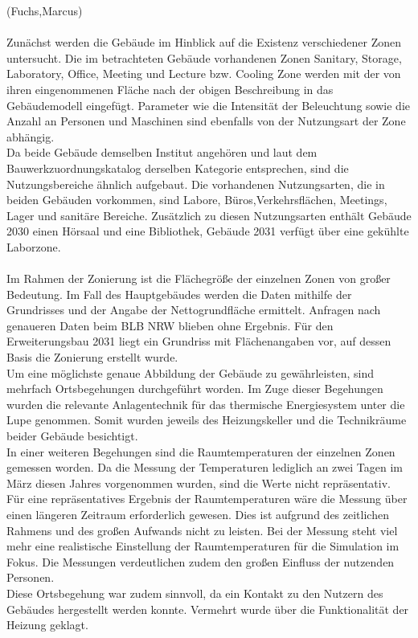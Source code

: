 (Fuchs,Marcus)\\
\\
Zunächst werden die Gebäude im Hinblick auf die Existenz verschiedener Zonen untersucht. Die im betrachteten Gebäude vorhandenen Zonen Sanitary, Storage, Laboratory, Office, Meeting und Lecture bzw. Cooling Zone werden mit der von ihren eingenommenen Fläche nach der obigen Beschreibung in das Gebäudemodell eingefügt. Parameter wie die Intensität der Beleuchtung sowie die Anzahl an Personen und Maschinen sind ebenfalls von der Nutzungsart der Zone abhängig. \\
Da beide Gebäude demselben Institut angehören und laut dem Bauwerkzuordnungskatalog derselben Kategorie entsprechen, sind die Nutzungsbereiche ähnlich aufgebaut. Die vorhandenen Nutzungsarten, die in beiden Gebäuden vorkommen, sind Labore, Büros,Verkehrsflächen, Meetings, Lager und sanitäre Bereiche. Zusätzlich zu diesen Nutzungsarten enthält Gebäude 2030 einen Hörsaal und eine Bibliothek, Gebäude 2031 verfügt über eine gekühlte Laborzone.\\
\\
Im Rahmen der Zonierung ist die Flächegröße der einzelnen Zonen von großer Bedeutung. Im Fall des Hauptgebäudes werden die Daten mithilfe der Grundrisses und der Angabe der Nettogrundfläche ermittelt. Anfragen nach genaueren Daten beim BLB NRW blieben ohne Ergebnis. Für den Erweiterungsbau 2031 liegt ein Grundriss mit Flächenangaben vor, auf dessen Basis die Zonierung erstellt wurde.\\
Um eine möglichste genaue Abbildung der Gebäude zu gewährleisten, sind mehrfach Ortsbegehungen durchgeführt worden. Im Zuge dieser Begehungen wurden die relevante Anlagentechnik für das thermische Energiesystem unter die Lupe genommen. Somit wurden jeweils des Heizungskeller und die Technikräume beider Gebäude besichtigt. \\
In einer weiteren Begehungen sind die Raumtemperaturen der einzelnen Zonen gemessen worden. Da die Messung der Temperaturen lediglich an zwei Tagen im März diesen Jahres vorgenommen wurden, sind die Werte nicht repräsentativ. Für eine repräsentatives Ergebnis der Raumtemperaturen wäre die Messung über einen längeren Zeitraum erforderlich gewesen. Dies ist aufgrund des zeitlichen Rahmens und des großen Aufwands nicht zu leisten. Bei der Messung steht viel mehr eine realistische Einstellung der Raumtemperaturen für die Simulation im Fokus. Die Messungen verdeutlichen zudem den großen Einfluss der nutzenden Personen. \\
Diese Ortsbegehung war zudem sinnvoll, da ein Kontakt zu den Nutzern des Gebäudes hergestellt werden konnte. Vermehrt wurde über die Funktionalität der Heizung geklagt.\\

